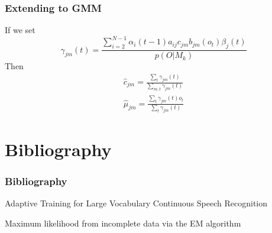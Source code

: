 \documentclass{beamer}
\begin{document}
\begin{frame}
\frametitle{Extending to GMM}
If we set
\begin{equation}
\gamma_{jm}(t)=\frac{\sum_{i=2}^{N-1}\alpha_i(t-1)a_{ij}c_{jm}b_{jm}(o_t)\beta_j(t)}{p(O|M_k)}
\end{equation}
Then
\begin{equation}
\begin{split}
\hat{c}_{jm}=\frac{\sum_t\gamma_{jm}(t)}{\sum_{m,t}\gamma_{jm}(t)} \\
\hat{\mu}_{jm}=\frac{\sum_t\gamma_{jm}(t)o_t}{\sum_{t}\gamma_{jm}(t)}
\end{split}
\end{equation}
\end{frame}


\section*{Bibliography}
\begin{frame}%
\frametitle{Bibliography}

\begin{thebibliography}{Tantau, 2007}
Adaptive Training for Large Vocabulary Continuous Speech Recognition

Maximum likelihood from incomplete data via the EM algorithm


\end{thebibliography}
\end{frame}
\end{document}
